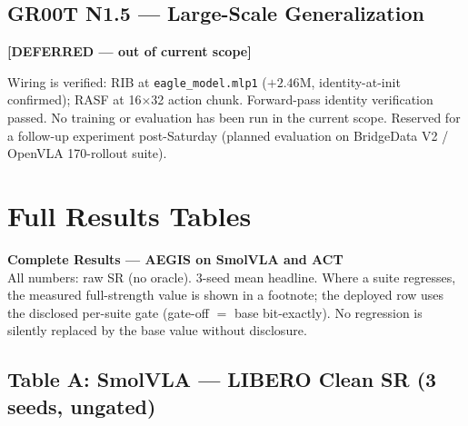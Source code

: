 \documentclass[11pt,a4paper]{article}
\begin{document}
\subsection{GR00T N1.5 — Large-Scale Generalization}
\label{sec:groot}

\textbf{[DEFERRED — out of current scope]}

Wiring is verified: RIB at \texttt{eagle\_model.mlp1} ($+2.46$M, identity-at-init confirmed);
RASF at 16$\times$32 action chunk. Forward-pass identity verification passed.
No training or evaluation has been run in the current scope. Reserved for a follow-up
experiment post-Saturday (planned evaluation on BridgeData V2 / OpenVLA 170-rollout suite).

\section{Full Results Tables}
\label{sec:tables}

\newpage
\thispagestyle{fancy}
\begin{center}
{\Large\bfseries Complete Results — AEGIS on SmolVLA and ACT}\\[0.5em]
{\small All numbers: raw SR (no oracle). 3-seed mean headline. Where a suite regresses, the measured full-strength value is shown in a footnote; the deployed row uses the disclosed per-suite gate (gate-off $=$ base bit-exactly). No regression is silently replaced by the base value without disclosure.}
\end{center}

\subsection*{Table A: SmolVLA — LIBERO Clean SR (3 seeds, ungated)}
\end{document}
